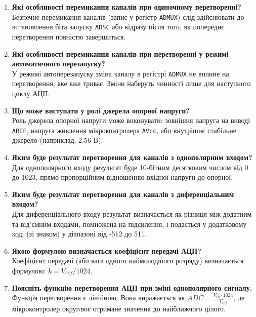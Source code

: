 \documentclass[14pt, a4paper]{extreport}
\begin{document}
\begin{enumerate}
		\item \textbf{Які особливості перемикання каналів при одиночному перетворенні?} \\ Безпечне перемикання каналів (запис у регістр \texttt{ADMUX}) слід здійснювати до встановлення біта запуску \texttt{ADSC} або відразу після того, як попереднє перетворення повністю завершиться.
		
		\item \textbf{Які особливості перемикання каналів при перетворенні у режимі автоматичного перезапуску?} \\ У режимі автоперезапуску зміна каналу в регістрі \texttt{ADMUX} не вплине на перетворення, яке вже триває. Зміни наберуть чинності лише для наступного циклу АЦП.
		
		\item \textbf{Що може виступати у ролі джерела опорної напруги?} \\ Роль джерела опорної напруги може виконувати: зовнішня напруга на виводі \texttt{AREF}, напруга живлення мікроконтролера \texttt{AVcc}, або внутрішнє стабільне джерело (наприклад, 2.56 В).
		
		\item \textbf{Яким буде результат перетворення для каналів з однополярним входом?} \\ Для однополярного входу результат буде 10-бітним десятковим числом від 0 до 1023, прямо пропорційним відношенню вхідної напруги до опорної.
		
		\item \textbf{Яким буде результат перетворення для каналів з диференціальним входом?} \\ Для диференціального входу результат визначається як різниця між додатним та від'ємним входами, помножена на підсилення, і подається у додатковому коді (зі знаком) у діапазоні від -512 до 511.
		
		\item \textbf{Якою формулою визначається коефіцієнт передачі АЦП?} \\ Коефіцієнт передачі (або вага одного наймолодшого розряду) визначається формулою: $k = V_{ref} / 1024$.
		
		\item \textbf{Поясніть функцію перетворення АЦП при зміні однополярного сигналу.} \\ Функція перетворення є лінійною. Вона виражається як $ADC = \frac{V_{in} \cdot 1024}{V_{ref}}$, де мікроконтролер округлює отримане значення до найближчого цілого.
		

\end{enumerate}
\end{document}
